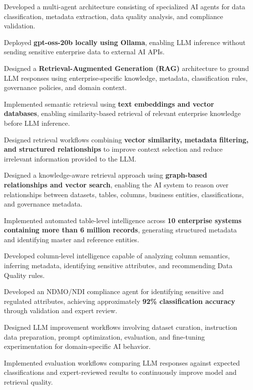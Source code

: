 \documentclass[letterpaper,11pt]{article}
\newcommand{\resumeItem}[1]{
  \item\small{
    {#1 \vspace{-2pt}}
  }
}
\begin{document}
  \resumeItem{
  Developed a multi-agent architecture consisting of specialized AI agents for data classification, metadata extraction, data quality analysis, and compliance validation.
  }

  \resumeItem{
  Deployed \textbf{gpt-oss-20b locally using Ollama}, enabling LLM inference without sending sensitive enterprise data to external AI APIs.
  }

  \resumeItem{
  Designed a \textbf{Retrieval-Augmented Generation (RAG)} architecture to ground LLM responses using enterprise-specific knowledge, metadata, classification rules, governance policies, and domain context.
  }

  \resumeItem{
  Implemented semantic retrieval using \textbf{text embeddings and vector databases}, enabling similarity-based retrieval of relevant enterprise knowledge before LLM inference.
  }

  \resumeItem{
  Designed retrieval workflows combining \textbf{vector similarity, metadata filtering, and structured relationships} to improve context selection and reduce irrelevant information provided to the LLM.
  }

  \resumeItem{
  Designed a knowledge-aware retrieval approach using \textbf{graph-based relationships and vector search}, enabling the AI system to reason over relationships between datasets, tables, columns, business entities, classifications, and governance metadata.
  }

  \resumeItem{
  Implemented automated table-level intelligence across \textbf{10 enterprise systems containing more than 6 million records}, generating structured metadata and identifying master and reference entities.
  }

  \resumeItem{
  Developed column-level intelligence capable of analyzing column semantics, inferring metadata, identifying sensitive attributes, and recommending Data Quality rules.
  }

  \resumeItem{
  Developed an NDMO/NDI compliance agent for identifying sensitive and regulated attributes, achieving approximately \textbf{92\% classification accuracy} through validation and expert review.
  }

  \resumeItem{
  Designed LLM improvement workflows involving dataset curation, instruction data preparation, prompt optimization, evaluation, and fine-tuning experimentation for domain-specific AI behavior.
  }

  \resumeItem{
  Implemented evaluation workflows comparing LLM responses against expected classifications and expert-reviewed results to continuously improve model and retrieval quality.
  }
\end{document}
